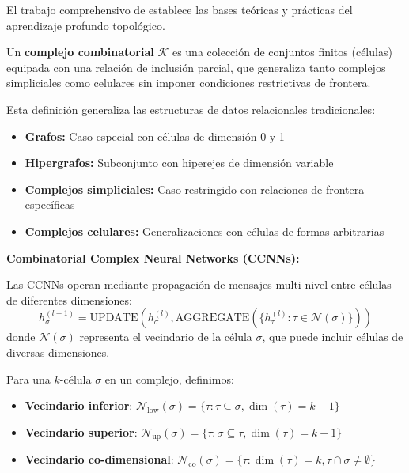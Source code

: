 El trabajo comprehensivo de \citet{hajij2023topological} establece las bases teóricas y prácticas del aprendizaje profundo topológico.

\begin{definition}\label{def:complejo_combinatorial}
Un \textbf{complejo combinatorial} $\mathcal{K}$ es una colección de conjuntos finitos (células) equipada con una relación de inclusión parcial, que generaliza tanto complejos simpliciales como celulares sin imponer condiciones restrictivas de frontera.
\end{definition}

Esta definición generaliza las estructuras de datos relacionales tradicionales:
\begin{itemize}
    \item \textbf{Grafos:} Caso especial con células de dimensión 0 y 1
    \item \textbf{Hipergrafos:} Subconjunto con hiperejes de dimensión variable
    \item \textbf{Complejos simpliciales:} Caso restringido con relaciones de frontera específicas
    \item \textbf{Complejos celulares:} Generalizaciones con células de formas arbitrarias
\end{itemize}

\textbf{Combinatorial Complex Neural Networks (CCNNs):}

Las CCNNs operan mediante propagación de mensajes multi-nivel entre células de diferentes dimensiones:
\[h_\sigma^{(l+1)} = \text{UPDATE}\left(h_\sigma^{(l)}, \text{AGGREGATE}\left(\{h_\tau^{(l)} : \tau \in \mathcal{N}(\sigma)\}\right)\right)\]
donde $\mathcal{N}(\sigma)$ representa el vecindario de la célula $\sigma$, que puede incluir células de diversas dimensiones.

\begin{definition}\label{def:vecindarios_complejos}
Para una $k$-célula $\sigma$ en un complejo, definimos:
\begin{itemize}
    \item \textbf{Vecindario inferior}: $\mathcal{N}_{\text{low}}(\sigma) = \{\tau : \tau \subseteq \sigma, \dim(\tau) = k-1\}$
    \item \textbf{Vecindario superior}: $\mathcal{N}_{\text{up}}(\sigma) = \{\tau : \sigma \subseteq \tau, \dim(\tau) = k+1\}$
    \item \textbf{Vecindario co-dimensional}: $\mathcal{N}_{\text{co}}(\sigma) = \{\tau : \dim(\tau) = k, \tau \cap \sigma \neq \emptyset\}$
\end{itemize}
\end{definition}


